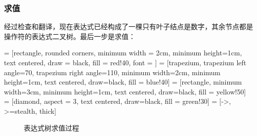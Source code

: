 \subsubsection{求值}
经过检查和翻译，现在表达式已经构成了一棵只有叶子结点是数字，其余节点都是操作符的表达式二叉树。最后一步是求值：

 = [rectangle, rounded corners, minimum width = 2cm, 
        minimum height=1cm, text centered, draw = black, fill = red!40,
        font = {\bfseries}]
     = [trapezium, trapezium left angle=70, trapezium right angle=110, 
    minimum width=2cm, minimum height=1cm, text centered, draw=black, fill = blue!40]
     = [rectangle, minimum width=3cm, minimum height=1cm, text centered, draw=black, fill = yellow!50]
     = [diamond, aspect = 3, text centered, draw=black, fill = green!30]
     = [->, >=stealth, thick]

\begin{figure}[H]
    \caption{表达式树求值过程}
\end{figure}